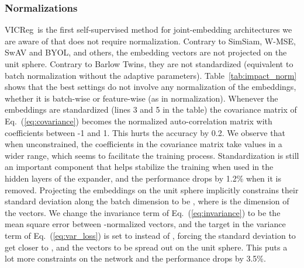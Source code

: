 \documentclass{article}
\newcommand{\algo}{VICReg}
\newcommand{\expandernospace}{expander}
\begin{document}
\subsubsection{Normalizations} 
\algo \ is the first self-supervised method for joint-embedding architectures we are aware of that does not require normalization. Contrary to SimSiam, W-MSE, SwAV and BYOL, and others, the embedding vectors are not projected on the unit sphere. Contrary to Barlow Twins, they are not standardized (equivalent to batch normalization without the adaptive parameters). Table~\ref{tab:impact_norm} shows that the best settings do not involve any normalization of the embeddings, whether it is batch-wise or feature-wise (as in   normalization). Whenever the embeddings are standardized (lines 3 and 5 in the table) the covariance matrix of Eq.~(\ref{eq:covariance}) becomes the normalized auto-correlation matrix with coefficients between -1 and 1. This hurts the accuracy by 0.2. We observe that when unconstrained, the coefficients in the covariance matrix take values in a wider range, which seems to facilitate the training process. Standardization is still an important component that helps stabilize the training when used in the hidden layers of the \expandernospace, and the performance drops by 1.2\% when it is removed. Projecting the embeddings on the unit sphere implicitly constrains their standard deviation along the batch dimension to be , where  is the dimension of the vectors. We change the invariance term of Eq.~(\ref{eq:invariance}) to be the mean square error between -normalized vectors, and the target  in the variance term of Eq.~(\ref{eq:var_loss}) is set to  instead of , forcing the standard deviation to get closer to , and the vectors to be spread out on the unit sphere. This puts a lot more constraints on the network and the performance drops by 3.5\%.

\clearpage
\end{document}

